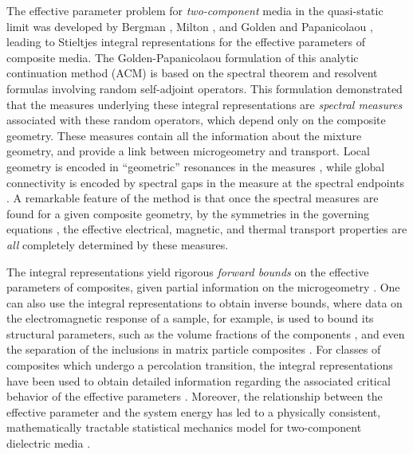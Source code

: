 \documentclass{cmslatex}
\begin{document}
The effective parameter problem for \emph{two-component} media in the
quasi-static limit was developed by Bergman \cite{Bergman:PRL-1285},
Milton \cite{Milton:APL-300}, and Golden and Papanicolaou
\cite{Golden:CMP-473}, leading to Stieltjes integral representations 
for the effective parameters of composite media. The
Golden-Papanicolaou formulation of this analytic continuation method
(ACM) is based on the spectral theorem and resolvent formulas
involving random self-adjoint operators. This formulation demonstrated
that the measures underlying these integral representations are
\emph{spectral measures} associated with these random operators, which
depend only on the composite geometry. These measures contain all the
information about the mixture geometry, and provide a link between
microgeometry and transport. Local geometry is encoded in
``geometric'' resonances in the measures
\cite{Jonckheere_Luck_JPA_1998}, while global connectivity is encoded
by spectral gaps in the measure at the spectral endpoints
\cite{Murphy:JMP:063506,Jonckheere_Luck_JPA_1998}. A remarkable
feature of the method is that once the spectral measures are found for 
a given composite geometry, by the symmetries in the governing
equations \cite{MILTON:2002:TC}, the effective electrical, magnetic,
and thermal transport properties are \emph{all} completely determined
by these measures.


The integral representations yield rigorous \emph{forward bounds} on
the effective parameters of composites, given partial information on
the microgeometry
\cite{Bergman:PRL-1285,Milton:APL-300,Golden:CMP-473,Bergman:AP-78}. One  
can also use the integral representations to obtain inverse bounds,
where data on the electromagnetic response of a sample, for example,
is used to bound its structural parameters, such as the volume
fractions of the components
\cite{Cherkaeva:WRM-437,Cherkaeva:IP-1203,Cherkaeva:IP-065008,Zhang:JCP-5390,Bonifasi-Lista:PMB-3063,Cherkaev:JBiomech-345,Day:JPCM-99,Golden:J_Biomech:337},
and even the separation of the inclusions in matrix particle
composites \cite{Orum:PRSLA:2012}. For classes of composites which
undergo a percolation transition, the integral representations have
been used to obtain detailed information regarding the associated
critical behavior of the effective parameters
\cite{Golden:PRL-3935,Murphy:JMP:063506}. Moreover, the relationship
between the effective parameter and the system energy has led to a
physically consistent, mathematically tractable statistical mechanics
model for two-component dielectric media \cite{Murphy_Thermo_Stat_Mech}.
\end{document}
